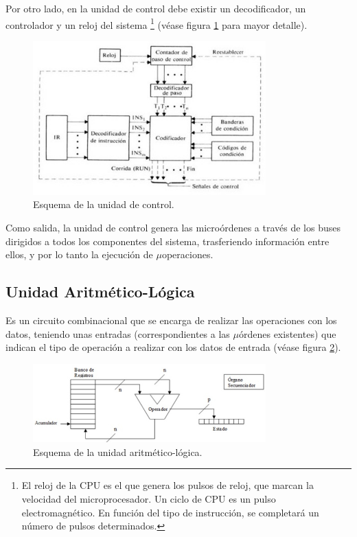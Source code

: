 \documentclass[a4paper, 11pt, titlepage]{article}
\begin{document}
        Por otro lado, en la unidad de control debe existir un decodificador, un controlador y un reloj del 
        sistema \footnote{
            El reloj de la CPU es el que genera los pulsos de reloj, que marcan la velocidad del microprocesador. Un ciclo 
            de CPU es un pulso electromagnético. En función del tipo de instrucción, se completará un número de pulsos 
            determinados.
        } (véase figura \ref{unidadcontrol} para mayor detalle).

        \begin{figure}[htp]
            \centering
            \includegraphics[width=0.8\textwidth]{resources/unidadcontrol.jpg}
            \caption{Esquema de la unidad de control.}
            \label{unidadcontrol}
        \end{figure}

        Como salida, la unidad de control genera las microórdenes a través de los buses dirigidos a todos los 
        componentes del sistema, trasferiendo información entre ellos, y por lo tanto la ejecución de $\mu$operaciones.

    \subsection{Unidad Aritmético-Lógica}

        Es un circuito combinacional que se encarga de realizar las operaciones con los datos, teniendo unas 
        entradas (correspondientes a las $\mu$órdenes existentes) que indican el tipo de operación a realizar 
        con los datos de entrada (véase figura \ref{alu}).

        \begin{figure}[htp]
            \centering
            \includegraphics[width=0.8\textwidth]{resources/alu.jpg}
            \caption{Esquema de la unidad aritmético-lógica.}
            \label{alu}
        \end{figure}
\end{document}
